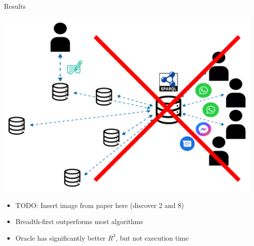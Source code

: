 
\begin{frame}{Results}
  \vspace{-0.5cm}
  \begin{center}
    \includegraphics[width=\linewidth,height=0.7\textheight,keepaspectratio]{images/centralize-personal-data-stores-no.pdf}
  \end{center}
  \vspace{0.3cm}

  \begin{center}
    \small
    \begin{itemize}
        \item TODO: Insert image from paper here (discover 2 and 8)
        \item Breadth-first outperforms most algorithms
        \item Oracle has significantly better $R^{3}$, but not execution time
    \end{itemize}
  \end{center}
\end{frame}

